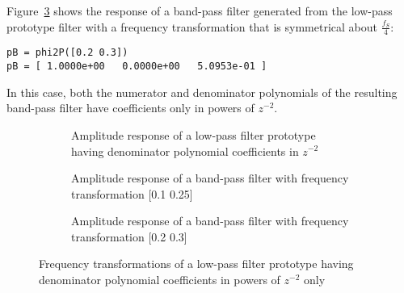 \documentclass[a4paper,twoside,10pt,english]{report}
\begin{document}
Figure~\ref{subfig:freq-transform-structure-bandpass-B} shows the response of
a band-pass filter generated from the low-pass prototype filter with a
frequency transformation that is symmetrical about $\frac{f_{S}}{4}$:
\begin{small}
\begin{verbatim}
pB = phi2P([0.2 0.3])
pB = [ 1.0000e+00   0.0000e+00   5.0953e-01 ]
\end{verbatim}
\end{small}
In this case, both the numerator and denominator polynomials of the resulting
band-pass filter have coefficients only in powers of $z^{-2}$. 

\begin{figure}[!htbp]
\begin{center}
\begin{subfigure}{\textwidth}
\begin{center}
\scalebox{0.4}{}
\caption{Amplitude response of a low-pass filter prototype having denominator polynomial coefficients in $z^{-2}$}
\label{subfig:freq-transform-structure-lowpass}
\vspace{1cm}
\end{center}
\end{subfigure}
\begin{subfigure}{\textwidth}
\begin{center}
\scalebox{0.4}{}
\caption{Amplitude response of a band-pass filter with frequency transformation [0.1 0.25]}
\label{subfig:freq-transform-structure-bandpass-A}
\vspace{1cm}
\end{center}
\end{subfigure}
\begin{subfigure}{\textwidth}
\begin{center}
\scalebox{0.4}{}
\caption{Amplitude response of a band-pass filter with frequency transformation [0.2 0.3]}
\label{subfig:freq-transform-structure-bandpass-B}
\end{center}
\end{subfigure}
\caption{Frequency transformations of a low-pass filter prototype having denominator polynomial coefficients in powers of $z^{-2}$ only}
\label{fig:freq-transform-structure}
\end{center}
\end{figure}
\clearpage
\end{document}

